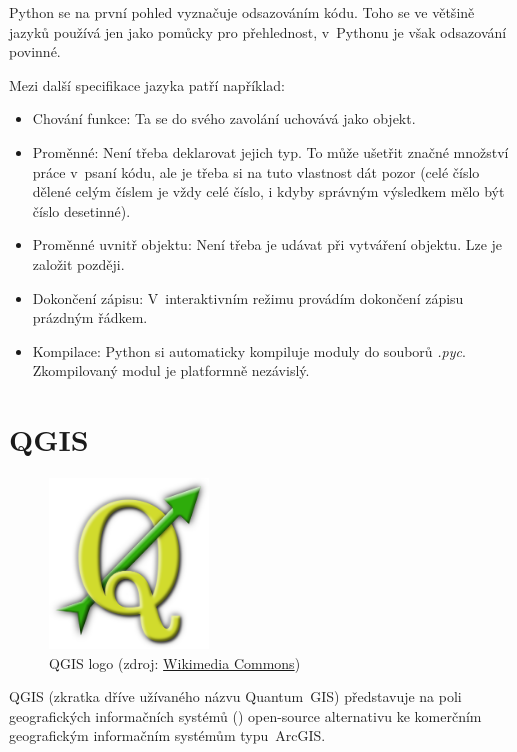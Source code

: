 Python se na první pohled vyznačuje odsazováním kódu. Toho se ve většině jazyků používá jen jako
pomůcky pro přehlednost, v~Pythonu je však odsazování povinné. 

Mezi další specifikace jazyka patří například: 
\begin{itemize}

	\item Chování funkce: Ta se do svého zavolání uchovává jako objekt. 
	
	\item Proměnné: Není třeba deklarovat jejich typ. To může ušetřit značné množství práce
	v~psaní kódu, ale je třeba si na tuto vlastnost dát pozor (celé číslo dělené celým číslem je
	vždy celé číslo, i kdyby správným výsledkem mělo být číslo desetinné). 
	
	\item Proměnné uvnitř objektu: Není třeba je udávat při vytváření objektu. Lze je založit později. 
	
	\item Dokončení zápisu: V~interaktivním režimu provádím dokončení zápisu prázdným řádkem. 
	
	\item Kompilace: Python si automaticky kompiluje moduly do souborů \textit{.pyc}. Zkompilovaný
	modul je platformně nezávislý. 

\end{itemize}


\section{QGIS}
\label{qgis}

  \begin{figure}[H]
    \centering
      \includegraphics[width=120pt]{./pictures/qgis.png}
      \caption[QGIS logo]{QGIS logo 
      (zdroj: \href{https://commons.wikimedia.org/wiki/File:QGIS\_logo.svg}{Wikimedia Commons})}
      \label{fig:qgis}
  \end{figure}

QGIS (zkratka dříve užívaného názvu Quantum~GIS) představuje na poli geogra\-fic\-kých informačních systémů () open-source alternativu ke komerčním geografickým informačním systémům typu~ArcGIS. 

